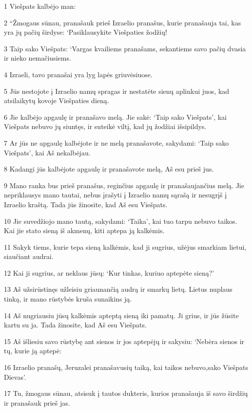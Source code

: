 \par 1 Viešpats kalbėjo man: 
\par 2 “Žmogaus sūnau, pranašauk prieš Izraelio pranašus, kurie pranašauja tai, kas yra jų pačių širdyse: ‘Pasiklausykite Viešpaties žodžių! 
\par 3 Taip sako Viešpats: ‘Vargas kvailiems pranašams, sekantiems savo pačių dvasia ir nieko nemačiusiems. 
\par 4 Izraeli, tavo pranašai yra lyg lapės griuvėsiuose. 
\par 5 Jūs nestojote į Izraelio namų spragas ir nestatėte sienų aplinkui juos, kad atsilaikytų kovoje Viešpaties dieną. 
\par 6 Jie kalbėjo apgaulę ir pranašavo melą. Jie sakė: ‘Taip sako Viešpats’, kai Viešpats nebuvo jų siuntęs, ir suteikė viltį, kad jų žodžiai išsipildys. 
\par 7 Ar jūs ne apgaulę kalbėjote ir ne melą pranašavote, sakydami: ‘Taip sako Viešpats’, kai Aš nekalbėjau. 
\par 8 Kadangi jūs kalbėjote apgaulę ir pranašavote melą, Aš esu prieš jus. 
\par 9 Mano ranka bus prieš pranašus, reginčius apgaulę ir pranašaujančius melą. Jie nepriklausys mano tautai, nebus įrašyti į Izraelio namų sąrašą ir nesugrįš į Izraelio kraštą. Tada jūs žinosite, kad Aš esu Viešpats. 
\par 10 Jie suvedžiojo mano tautą, sakydami: ‘Taika’, kai tuo tarpu nebuvo taikos. Kai jie stato sieną iš akmenų, kiti aptepa ją kalkėmis. 
\par 11 Sakyk tiems, kurie tepa sieną kalkėmis, kad ji sugrius, užėjus smarkiam lietui, siaučiant audrai. 
\par 12 Kai ji sugrius, ar neklaus jūsų: ‘Kur tinkas, kuriuo aptepėte sieną?’ 
\par 13 Aš užsirūstinęs užleisiu griaunančią audrą ir smarkų lietų. Lietus nuplaus tinką, ir mano rūstybės kruša sunaikins ją. 
\par 14 Aš nugriausiu jūsų kalkėmis apteptą sieną iki pamatų. Ji grius, ir jūs žūsite kartu su ja. Tada žinosite, kad Aš esu Viešpats. 
\par 15 Aš išliesiu savo rūstybę ant sienos ir jos aptepėjų ir sakysiu: ‘Nebėra sienos ir tų, kurie ją aptepė: 
\par 16 Izraelio pranašų, Jeruzalei pranašavusių taiką, kai taikos nebuvo,­sako Viešpats Dievas’. 
\par 17 Tu, žmogaus sūnau, atsisuk į tautos dukteris, kurios pranašauja iš savo širdžių ir pranašauk prieš jas. 
